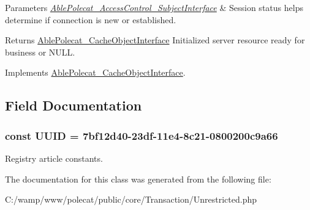 \begin{DoxyParams}{Parameters}
{\em \hyperlink{interface_able_polecat___access_control___subject_interface}{Able\+Polecat\+\_\+\+Access\+Control\+\_\+\+Subject\+Interface}} & Session status helps determine if connection is new or established.\\
\hline
\end{DoxyParams}
\begin{DoxyReturn}{Returns}
\hyperlink{interface_able_polecat___cache_object_interface}{Able\+Polecat\+\_\+\+Cache\+Object\+Interface} Initialized server resource ready for business or N\+U\+L\+L. 
\end{DoxyReturn}


Implements \hyperlink{interface_able_polecat___cache_object_interface_a3f2135f6ad45f51d075657f6d20db2cd}{Able\+Polecat\+\_\+\+Cache\+Object\+Interface}.



\subsection{Field Documentation}
\hypertarget{class_able_polecat___transaction___unrestricted_a74b892c8c0b86bf9d04c5819898c51e7}{}
\subsubsection[{U\+U\+I\+D}]{\setlength{\rightskip}{0pt plus 5cm}const U\+U\+I\+D = \textquotesingle{}7bf12d40-\/23df-\/11e4-\/8c21-\/0800200c9a66\textquotesingle{}}\label{class_able_polecat___transaction___unrestricted_a74b892c8c0b86bf9d04c5819898c51e7}
Registry article constants. 

The documentation for this class was generated from the following file\+:\begin{DoxyCompactItemize}
\item 
C\+:/wamp/www/polecat/public/core/\+Transaction/Unrestricted.\+php\end{DoxyCompactItemize}
